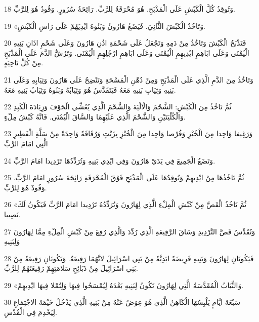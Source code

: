 \par 18 وَتُوقِدُ كُلَّ الْكَبْشِ عَلَى الْمَذْبَحِ. هُوَ مُحْرَقَةٌ لِلرَّبِّ. رَائِحَةُ سُرُورٍ. وَقُودٌ هُوَ لِلرَّبِّ.
\par 19 «وَتَاخُذُ الْكَبْشَ الثَّانِيَ. فَيَضَعُ هَارُونُ وَبَنُوهُ ايْدِيَهُمْ عَلَى رَاسِ الْكَبْشِ.
\par 20 فَتَذْبَحُ الْكَبْشَ وَتَاخُذُ مِنْ دَمِهِ وَتَجْعَلُ عَلَى شَحْمَةِ اذُنِ هَارُونَ وَعَلَى شَحْمِ اذَانِ بَنِيهِ الْيُمْنَى وَعَلَى ابَاهِمِ ايْدِيهِمِ الْيُمْنَى وَعَلَى ابَاهِمِ ارْجُلِهِمِ الْيُمْنَى. وَتَرُشُّ الدَّمَ عَلَى الْمَذْبَحِ مِنْ كُلِّ نَاحِيَةٍ.
\par 21 وَتَاخُذُ مِنَ الدَّمِ الَّذِي عَلَى الْمَذْبَحِ وَمِنْ دُهْنِ الْمَسْحَةِ وَتَنْضِحُ عَلَى هَارُونَ وَثِيَابِهِ وَعَلَى بَنِيهِ وَثِيَابِ بَنِيهِ مَعَهُ فَيَتَقَدَّسُ هُوَ وَثِيَابُهُ وَبَنُوهُ وَثِيَابُ بَنِيهِ مَعَهُ.
\par 22 ثُمَّ تَاخُذُ مِنَ الْكَبْشِ: الشَّحْمَ وَالْالْيَةَ وَالشَّحْمَ الَّذِي يُغَشِّي الْجَوْفَ وَزِيَادَةَ الْكَبِدِ وَالْكُلْيَتَيْنِ وَالشَّحْمَ الَّذِي عَلَيْهِمَا وَالسَّاقَ الْيُمْنَى. فَانَّهُ كَبْشُ مِلْءٍ.
\par 23 وَرَغِيفا وَاحِدا مِنَ الْخُبْزِ وَقُرْصا وَاحِدا مِنَ الْخُبْزِ بِزَيْتٍ وَرُقَاقَةً وَاحِدَةً مِنْ سَلَّةِ الْفَطِيرِ الَّتِي امَامَ الرَّبِّ
\par 24 وَتَضَعُ الْجَمِيعَ فِي يَدَيْ هَارُونَ وَفِي ايْدِي بَنِيهِ وَتُرَدِّدُهَا تَرْدِيدا امَامَ الرَّبِّ.
\par 25 ثُمَّ تَاخُذُهَا مِنْ ايْدِيهِمْ وَتُوقِدُهَا عَلَى الْمَذْبَحِ فَوْقَ الْمُحْرَقَةِ رَائِحَةَ سُرُورٍ امَامَ الرَّبِّ. وَقُودٌ هُوَ لِلرَّبِّ.
\par 26 «ثُمَّ تَاخُذُ الْقَصَّ مِنْ كَبْشِ الْمِلْءِ الَّذِي لِهَارُونَ وَتُرَدِّدُهُ تَرْدِيدا امَامَ الرَّبِّ فَيَكُونُ لَكَ نَصِيبا.
\par 27 وَتُقَدِّسُ قَصَّ التَّرْدِيدِ وَسَاقَ الرَّفِيعَةِ الَّذِي رُدِّدَ وَالَّذِي رُفِعَ مِنْ كَبْشِ الْمِلْءِ مِمَّا لِهَارُونَ وَلِبَنِيهِ
\par 28 فَيَكُونَانِ لِهَارُونَ وَبَنِيهِ فَرِيضَةً ابَدِيَّةً مِنْ بَنِي اسْرَائِيلَ لانَّهُمَا رَفِيعَةٌ. وَيَكُونَانِ رَفِيعَةً مِنْ بَنِي اسْرَائِيلَ مِنْ ذَبَائِحِ سَلامَتِهِمْ رَفِيعَتَهُمْ لِلرَّبِّ.
\par 29 «وَالثِّيَابُ الْمُقَدَّسَةُ الَّتِي لِهَارُونَ تَكُونُ لِبَنِيهِ بَعْدَهُ لِيُمْسَحُوا فِيهَا وَلِتُمْلا فِيهَا ايْدِيهِمْ.
\par 30 سَبْعَةَ ايَّامٍ يَلْبِسُهَا الْكَاهِنُ الَّذِي هُوَ عِوَضٌ عَنْهُ مِنْ بَنِيهِ الَّذِي يَدْخُلُ خَيْمَةَ الاجْتِمَاعِ لِيَخْدِمَ فِي الْقُدْسِ.
